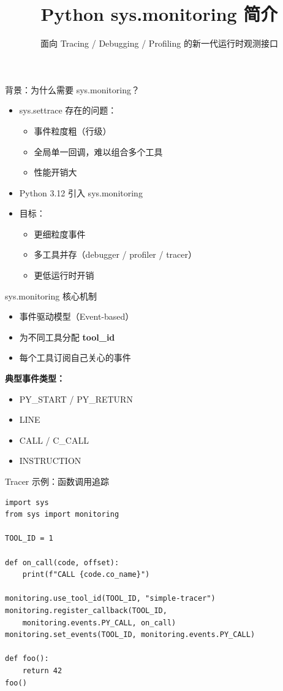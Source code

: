 \documentclass{beamer}
\title{Python sys.monitoring 简介}
\subtitle{面向 Tracing / Debugging / Profiling 的新一代运行时观测接口}
\author{}
\date{}
\begin{document}
\begin{frame}
  \titlepage
\end{frame}

\begin{frame}{背景：为什么需要 sys.monitoring？}
\begin{itemize}
  \item sys.settrace 存在的问题：
    \begin{itemize}
      \item 事件粒度粗（行级）
      \item 全局单一回调，难以组合多个工具
      \item 性能开销大
    \end{itemize}
  \item Python 3.12 引入 sys.monitoring
  \item 目标：
    \begin{itemize}
      \item 更细粒度事件
      \item 多工具并存（debugger / profiler / tracer）
      \item 更低运行时开销
    \end{itemize}
\end{itemize}
\end{frame}

\begin{frame}{sys.monitoring 核心机制}
\begin{itemize}
  \item 事件驱动模型（Event-based）
  \item 为不同工具分配 \textbf{tool\_id}
  \item 每个工具订阅自己关心的事件
\end{itemize}

\textbf{典型事件类型：}
\begin{itemize}
  \item PY\_START / PY\_RETURN
  \item LINE
  \item CALL / C\_CALL
  \item INSTRUCTION
\end{itemize}
\end{frame}

\begin{frame}[fragile]{Tracer 示例：函数调用追踪}
\begin{verbatim}
import sys
from sys import monitoring

TOOL_ID = 1

def on_call(code, offset):
    print(f"CALL {code.co_name}")

monitoring.use_tool_id(TOOL_ID, "simple-tracer")
monitoring.register_callback(TOOL_ID,
    monitoring.events.PY_CALL, on_call)
monitoring.set_events(TOOL_ID, monitoring.events.PY_CALL)

def foo():
    return 42
foo()
\end{verbatim}
\end{frame}
\end{document}
